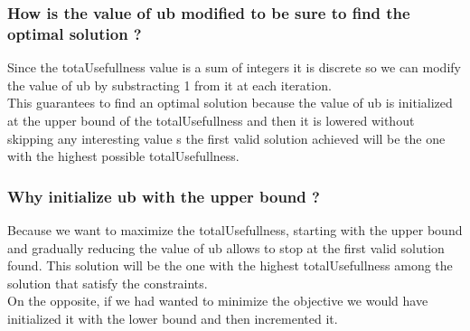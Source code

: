 \documentclass{eplDoc}
\begin{document}
\subsubsection{How is the value of ub modified to be sure to find the optimal solution ?}
Since the totaUsefullness value is a sum of integers it is discrete so we can modify the value of ub by substracting 1 from it at each iteration. \\ 
This guarantees to find an optimal solution because the value of ub is initialized at the upper bound of the totalUsefullness and then it is lowered without skipping any interesting value s the first valid solution achieved will be the one with the highest possible totalUsefullness. 

\subsubsection{Why initialize ub with the upper bound ?}
Because we want to maximize the totalUsefullness, starting with the upper bound and gradually reducing the value of ub allows to stop at the first valid solution found. This solution will be the one with the highest totalUsefullness among the solution that satisfy the constraints. \\ 
On the opposite, if we had wanted to minimize the objective we would have initialized it with the lower bound and then incremented it.
\end{document}
